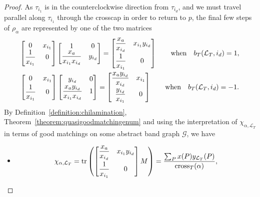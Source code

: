 \documentclass[pdftex]{sigma}
\numberwithin{equation}{section}
\theoremstyle{definition}
\begin{document}
\begin{proof}
As $\tau_{i_1}$ is in the counterclockwise direction from $\tau_{i_{d}}$, and we must travel parallel along $\tau_{i_1}$ through the crosscap in order to return to $p$, the final few steps of $\rho_{\alpha}$ are represented by one of the two matrices
\begin{gather}
\begin{bmatrix}
0 & x_{i_1}\\
\dfrac{1}{x_{i_1}} & 0
\end{bmatrix}
\begin{bmatrix}
1 & 0\\
\dfrac{x_{a}}{x_{i_1}x_{i_d}} & y_{i_d}
\end{bmatrix}=\begin{bmatrix}
\dfrac{x_a}{x_{i_d}} & x_{i_1}y_{i_d}\vspace{1mm}\\
\dfrac{1}{x_{i_1}} & 0
\end{bmatrix}\qquad\text{when}\quad b_T(\mathcal{L}_T, i_d)=1, \label{eqn:finalstep1}\\
\begin{bmatrix}
0 & x_{i_1}\vspace{1mm}\\
\dfrac{1}{x_{i_1}} & 0
\end{bmatrix}
\begin{bmatrix}
y_{i_d} & 0\vspace{1mm}\\
\dfrac{x_{a}y_{i_d}}{x_{i_1}x_{i_d}} & 1
\end{bmatrix}=\begin{bmatrix}
\dfrac{x_ay_{i_d}}{x_{i_d}} & x_{i_1}\vspace{1mm}\\
\dfrac{y{_{i_d}}}{x_{i_1}} & 0
\end{bmatrix}\qquad\text{when}\quad b_T(\mathcal{L}_T, i_d)=-1. \label{eqn:finalstep2}
\end{gather}
By Definition~\ref{definition:chilamination}, Theorem~\ref{theorem:quasigoodmatchingenum} and using the interpretation of $\chi_{\alpha, \mathcal{L}_T}$ in terms of good matchings on some abstract band graph $\mathcal{G}$, we have
\begin{itemize}\itemsep=0pt
\item
\[
\chi_{\alpha, \mathcal{L}_T}=\operatorname{tr}\left(\begin{bmatrix}
\dfrac{x_a}{x_{i_d}} & x_{i_1}y_{i_d}\vspace{1mm}\\
\dfrac{1}{x_{i_1}} & 0
\end{bmatrix}M\right)=\frac{\sum_P x(P)y_{\mathcal{L}_T}(P)}{\operatorname{cross}_T(\alpha)},\]

\end{itemize}
\end{proof}
\end{document}
